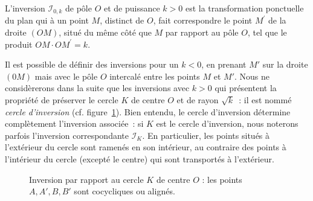 \begin{definition}
L'inversion $\mathcal{I}_{0, k}$ de pôle $O$ et de puissance $k>0$ est la transformation ponctuelle du plan qui à un point $M$, distinct de $O$, fait correspondre le point $M^\prime$ de la droite $(OM)$, situé du même côté que $M$ par rapport au pôle $O$, tel que le produit $OM \cdot OM^\prime = k$.
\end{definition}

Il est possible de définir des inversions pour un $k<0$, en prenant $M'$ sur la droite $(0M)$ mais avec le pôle $O$ intercalé entre les points $M$ et $M'$. Nous ne considèrerons dans la suite que les inversions avec $k>0$ qui présentent la propriété de préserver le cercle $K$ de centre $O$ et de rayon $\sqrt{k}$~: il est nommé \emph{cercle d'inversion} (cf. figure~\ref{fig1}). Bien entendu, le cercle d'inversion détermine complètement l'inversion associée~: si $K$ est le cercle d'inversion, nous noterons parfois l'inversion correspondante $\mathcal{I}_K$. En particulier, les points situés à l'extérieur du cercle sont ramenés en son intérieur, au contraire des points à l'intérieur du cercle (excepté le centre) qui sont transportés à l'extérieur. 
\begin{figure}[ht]
\begin{center}
\shorthandoff{!}\shorthandoff{:}
\shorthandon{!}\shorthandoff{:}
\caption{Inversion par rapport au cercle $K$ de centre $O$ : les points $A,A', B,B'$ sont cocycliques ou alignés.}\label{fig1}
\end{center}
\end{figure}

